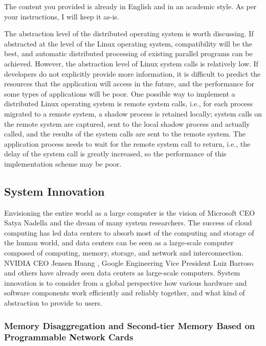 The content you provided is already in English and in an academic style. As per your instructions, I will keep it as-is.

The abstraction level of the distributed operating system is worth discussing. If abstracted at the level of the Linux operating system, compatibility will be the best, and automatic distributed processing of existing parallel programs can be achieved. However, the abstraction level of Linux system calls is relatively low. If developers do not explicitly provide more information, it is difficult to predict the resources that the application will access in the future, and the performance for some types of applications will be poor. One possible way to implement a distributed Linux operating system is remote system calls, i.e., for each process migrated to a remote system, a shadow process is retained locally; system calls on the remote system are captured, sent to the local shadow process and actually called, and the results of the system calls are sent to the remote system. The application process needs to wait for the remote system call to return, i.e., the delay of the system call is greatly increased, so the performance of this implementation scheme may be poor.

\subsection{System Innovation}
\label{future:system}

Envisioning the entire world as a large computer is the vision of Microsoft CEO Satya Nadella and the dream of many system researchers. The success of cloud computing has led data centers to absorb most of the computing and storage of the human world, and data centers can be seen as a large-scale computer composed of computing, memory, storage, and network and interconnection. NVIDIA CEO Jensen Huang \cite{nvidia-datacenter}, Google Engineering Vice President Luiz Barroso \cite{barroso2018datacenter} and others have already seen data centers as large-scale computers. System innovation is to consider from a global perspective how various hardware and software components work efficiently and reliably together, and what kind of abstraction to provide to users.

\subsubsection{Memory Disaggregation and Second-tier Memory Based on Programmable Network Cards}
\label{future:second-tier-memory}

